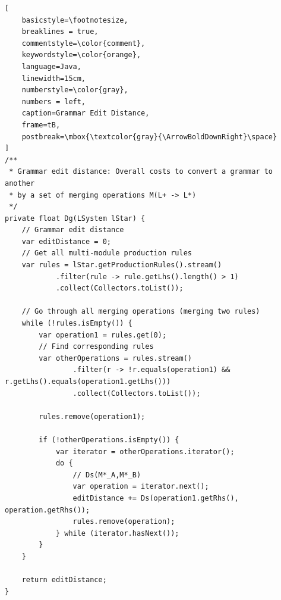 \begin{lstlisting}[
    basicstyle=\footnotesize,
    breaklines = true,
    commentstyle=\color{comment},
    keywordstyle=\color{orange},
    language=Java,
    linewidth=15cm,
    numberstyle=\color{gray},
    numbers = left,
    caption=Grammar Edit Distance,
    frame=tB,
    postbreak=\mbox{\textcolor{gray}{\ArrowBoldDownRight}\space}
]
/**
 * Grammar edit distance: Overall costs to convert a grammar to another
 * by a set of merging operations M(L+ -> L*)
 */
private float Dg(LSystem lStar) {
    // Grammar edit distance
    var editDistance = 0;
    // Get all multi-module production rules
    var rules = lStar.getProductionRules().stream()
            .filter(rule -> rule.getLhs().length() > 1)
            .collect(Collectors.toList());

    // Go through all merging operations (merging two rules)
    while (!rules.isEmpty()) {
        var operation1 = rules.get(0);
        // Find corresponding rules
        var otherOperations = rules.stream()
                .filter(r -> !r.equals(operation1) && r.getLhs().equals(operation1.getLhs()))
                .collect(Collectors.toList());

        rules.remove(operation1);

        if (!otherOperations.isEmpty()) {
            var iterator = otherOperations.iterator();
            do {
                // Ds(M*_A,M*_B)
                var operation = iterator.next();
                editDistance += Ds(operation1.getRhs(), operation.getRhs());
                rules.remove(operation);
            } while (iterator.hasNext());
        }
    }

    return editDistance;
}
\end{lstlisting}

\newpage

